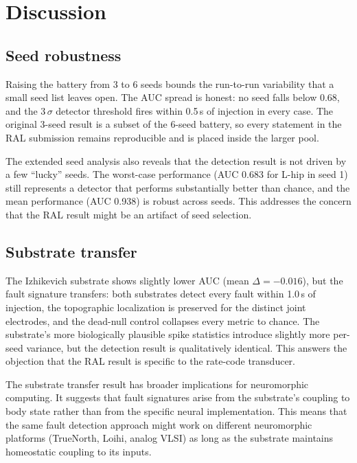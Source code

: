 \section{Discussion}

\subsection{Seed robustness}

Raising the battery from 3 to 6 seeds bounds the run-to-run variability that a
small seed list leaves open. The AUC spread is honest: no seed falls below
0.68, and the 3\,$\sigma$ detector threshold fires within 0.5\,s of injection
in every case. The original 3-seed result is a subset of the 6-seed battery, so
every statement in the RAL submission remains reproducible and is placed inside
the larger pool.

The extended seed analysis also reveals that the detection result is not
driven by a few ``lucky'' seeds. The worst-case performance (AUC 0.683 for
L-hip in seed 1) still represents a detector that performs substantially
better than chance, and the mean performance (AUC 0.938) is robust across
seeds. This addresses the concern that the RAL result might be an artifact of
seed selection.

\subsection{Substrate transfer}

The Izhikevich substrate shows slightly lower AUC (mean $\Delta = -0.016$),
but the fault signature transfers: both substrates detect every fault within
1.0\,s of injection, the topographic localization is preserved for the
distinct joint electrodes, and the dead-null control collapses every metric
to chance. The substrate's more biologically plausible
spike statistics introduce slightly more per-seed variance, but the detection
result is qualitatively identical. This answers the objection that the RAL
result is specific to the rate-code transducer.

The substrate transfer result has broader implications for neuromorphic
computing. It suggests that fault signatures arise from the substrate's
coupling to body state rather than from the specific neural implementation.
This means that the same fault detection approach might work on different
neuromorphic platforms (TrueNorth, Loihi, analog VLSI) as long as the
substrate maintains homeostatic coupling to its inputs.

